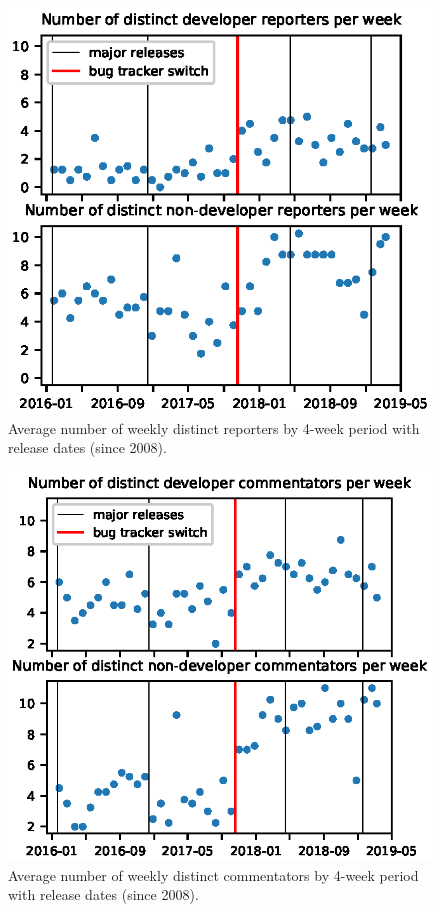 \documentclass[conference]{IEEEtran}
\begin{document}
\begin{figure}
\includegraphics{reporters_with_releases.eps}
\caption{Average number of weekly distinct reporters by 4-week period with release dates (since 2008).} \label{reporters_with_releases}
\end{figure}

\begin{figure}
\includegraphics{commentators_with_releases.eps}
\caption{Average number of weekly distinct commentators by 4-week period with release dates (since 2008).} \label{commentators_with_releases}
\end{figure}
\end{document}
